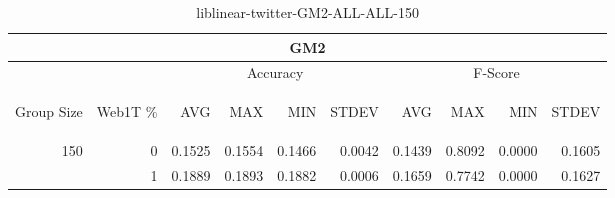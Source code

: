 \begin{center}
\begin{table}[htbp]
\begin{tabular}{ | r | r | r | r | r | r | r | r | r | r |}
\hline
\multicolumn{10}{|c|}{GM2}\\
\hline
 & & \multicolumn{4}{|c|}{Accuracy} & \multicolumn{4}{|c|}{F-Score}\\ \cline{3-10}
\begin{sideways}Group Size\end{sideways} & \begin{sideways}Web1T \%\end{sideways} & \begin{sideways}AVG\end{sideways} & \begin{sideways}MAX\end{sideways} & \begin{sideways}MIN\end{sideways} & \begin{sideways}STDEV\end{sideways} & \begin{sideways}AVG\end{sideways} & \begin{sideways}MAX\end{sideways} & \begin{sideways}MIN\end{sideways} & \begin{sideways}STDEV\end{sideways}\\
\hline
\multirow{1}{*}{150}
 & 0 & 0.1525 & 0.1554 & 0.1466 & 0.0042 & 0.1439 & 0.8092 & 0.0000 & 0.1605\\ \cline{2-10}
 & 1 & 0.1889 & 0.1893 & 0.1882 & 0.0006 & 0.1659 & 0.7742 & 0.0000 & 0.1627\\ \cline{2-10}
\hline
\end{tabular}
\caption{liblinear-twitter-GM2-ALL-ALL-150}
\label{table:liblinear-twitter-GM2-ALL-ALL-150}
\end{table}
\end{center}


